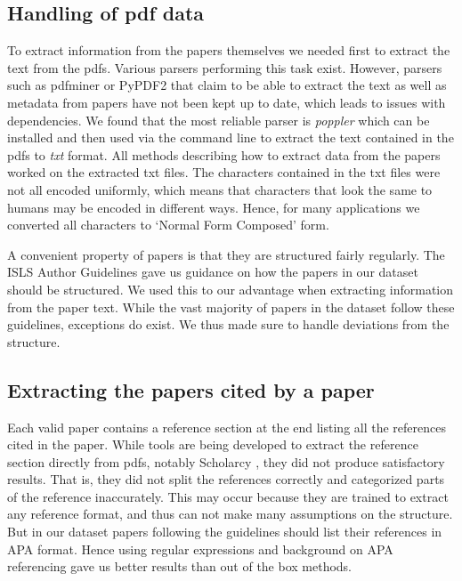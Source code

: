 \documentclass[article,twocolumn]{IEEEtran}
\begin{document}
    \hypertarget{handling-of-pdf-data}{%
\subsection{Handling of pdf data}\label{handling-of-pdf-data}}

To extract information from the papers themselves we needed first to
extract the text from the pdfs. Various parsers performing this task
exist. However, parsers such as pdfminer or PyPDF2 that claim to be able
to extract the text as well as metadata from papers have not been kept
up to date, which leads to issues with dependencies. We found that the
most reliable parser is \emph{poppler} \cite{poppler} which can be
installed and then used via the command line to extract the text
contained in the pdfs to \emph{txt} format. All methods describing how
to extract data from the papers worked on the extracted txt files. The
characters contained in the txt files were not all encoded uniformly,
which means that characters that look the same to humans may be encoded
in different ways. Hence, for many applications we converted all
characters to `Normal Form Composed' form.

A convenient property of papers is that they are structured fairly
regularly. The ISLS Author Guidelines \cite{guidelines} gave us guidance
on how the papers in our dataset should be structured. We used this to
our advantage when extracting information from the paper text. While the
vast majority of papers in the dataset follow these guidelines,
exceptions do exist. We thus made sure to handle deviations from the
structure.

\hypertarget{extracting-the-papers-cited-by-a-paper}{%
\subsection{Extracting the papers cited by a
paper}\label{extracting-the-papers-cited-by-a-paper}}

Each valid paper contains a reference section at the end listing all the
references cited in the paper. While tools are being developed to
extract the reference section directly from pdfs, notably Scholarcy
\cite{scholarcy}, they did not produce satisfactory results. That is,
they did not split the references correctly and categorized parts of the
reference inaccurately. This may occur because they are trained to
extract any reference format, and thus can not make many assumptions on
the structure. But in our dataset papers following the guidelines should
list their references in APA format. Hence using regular expressions and
background on APA referencing gave us better results than out of the box
methods.
\end{document}
